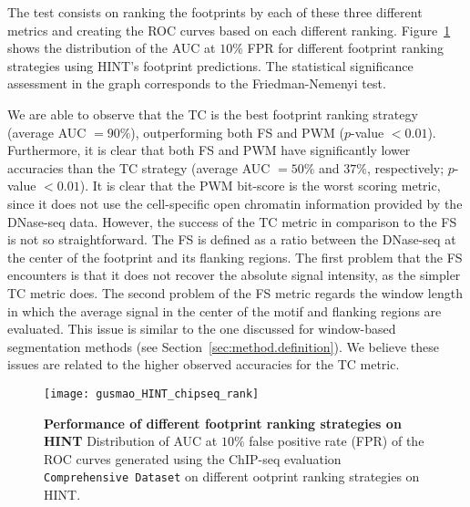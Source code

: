 The test consists on ranking the footprints by each of these three different metrics and creating the ROC curves based on each different ranking. Figure~\ref{fig:gusmao_HINT_chipseq_rank} shows the distribution of the AUC at $10\%$ FPR for different footprint ranking strategies using HINT's footprint predictions. The statistical significance assessment in the graph corresponds to the Friedman-Nemenyi test.

We are able to observe that the TC is the best footprint ranking strategy (average AUC $= 90\%$), outperforming both FS and PWM ($p$-value $< 0.01$). Furthermore, it is clear that both FS and PWM have significantly lower accuracies than the TC strategy (average AUC $= 50\%$ and $37\%$, respectively; $p$-value $< 0.01$). It is clear that the PWM bit-score is the worst scoring metric, since it does not use the cell-specific open chromatin information provided by the DNase-seq data. However, the success of the TC metric in comparison to the FS is not so straightforward. The FS is defined as a ratio between the DNase-seq at the center of the footprint and its flanking regions. The first problem that the FS encounters is that it does not recover the absolute signal intensity, as the simpler TC metric does. The second problem of the FS metric regards the window length in which the average signal in the center of the motif and flanking regions are evaluated. This issue is similar to the one discussed for window-based segmentation methods (see Section~\ref{sec:method.definition}). We believe these issues are related to the higher observed accuracies for the TC metric.

\begin{figure}[h!]
\centering
\texttt{[image: gusmao\_HINT\_chipseq\_rank]}
\caption[Performance of different footprint ranking strategies on HINT]{\textbf{Performance of different footprint ranking strategies on HINT} Distribution of AUC at $10\%$ false positive rate (FPR) of the ROC curves generated using the ChIP-seq evaluation {\tt Comprehensive Dataset} on different ootprint ranking strategies on HINT.}
\label{fig:gusmao_HINT_chipseq_rank}
\end{figure}

